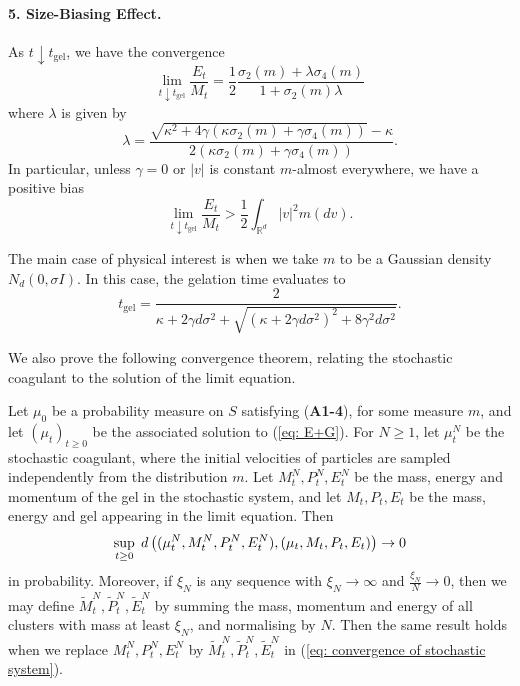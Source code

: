 \begin{theorem}
\paragraph{5. Size-Biasing Effect.} As $t\downarrow t_\mathrm{gel}$, we have the convergence \begin{equation}
    \lim_{t\downarrow t_\mathrm{gel}}\frac{E_t}{M_t}=\frac{1}{2}\frac{\sigma_2(m)+\lambda\sigma_4(m)}{1+\sigma_2(m)\lambda}
\end{equation} where $\lambda$ is given by \begin{equation} \lambda=\frac{\sqrt{\kappa^2+4\gamma(\kappa\sigma_2(m)+\gamma \sigma_4(m))}-\kappa}{2(\kappa\sigma_2(m)+\gamma\sigma_4(m))}.\end{equation} In particular, unless $\gamma=0$ or $|v|$ is constant $m$-almost everywhere, we have a positive bias \begin{equation}
    \lim_{t\downarrow t_\mathrm{gel}}\frac{E_t}{M_t}>\frac{1}{2}\int_{\mathbb{R}^d}|v|^2m(dv).
\end{equation}

The main case of physical interest is when we take $m$ to be a Gaussian density $N_d(0, \sigma I)$. In this case, the gelation time evaluates to
\begin{equation}
    \label{eq: formula of tgel} t_\mathrm{gel} = \frac{2}{\kappa+2\gamma d \sigma^2+
    \sqrt{(\kappa+2\gamma d \sigma^2)^2+8\gamma^2 d \sigma^2}}.
\end{equation} \end{theorem}
We also prove the following convergence theorem, relating the stochastic coagulant to the solution of the limit equation.  
\begin{theorem} \label{thrm: convergence of stochastic coagulent} Let $\mu_0$ be a probability measure on $S$ satisfying (\textbf{A1-4}), for some measure $m$, and let $(\mu_t)_{t\ge 0}$ be the associated solution to (\ref{eq: E+G}). For $N\ge 1$, let $\mu^N_t$ be the stochastic coagulant, where the initial velocities of particles are sampled independently from the distribution $m$. Let $M^N_t, P^N_t, E^N_t$ be the mass, energy and momentum of the gel in the stochastic system, and let $M_t, P_t, E_t$ be the mass, energy and gel appearing in the limit equation. Then \begin{equation} \label{eq: convergence of stochastic system}
    \sup_{t\ge 0}\hspace{0.1cm}d\left((\mu^N_t, M^N_t, P^N_t, E^N_t),(\mu_t, M_t, P_t, E_t)\right) \rightarrow 0
\end{equation} in probability. Moreover, if $\xi_N$ is any sequence with $\xi_N\rightarrow \infty$ and $\frac{\xi_N}{N}\rightarrow 0$, then we may define $\widetilde{M}^N_t, \widetilde{P}^N_t, \widetilde{E}^N_t$ by summing the mass, momentum and energy of all clusters with mass at least $\xi_N$, and normalising by $N$. Then the same result holds when we replace $M^N_t, P^N_t, E^N_t$ by $\widetilde{M}^N_t, \widetilde{P}^N_t, \widetilde{E}^N_t$ in (\ref{eq: convergence of stochastic system}).
\end{theorem}